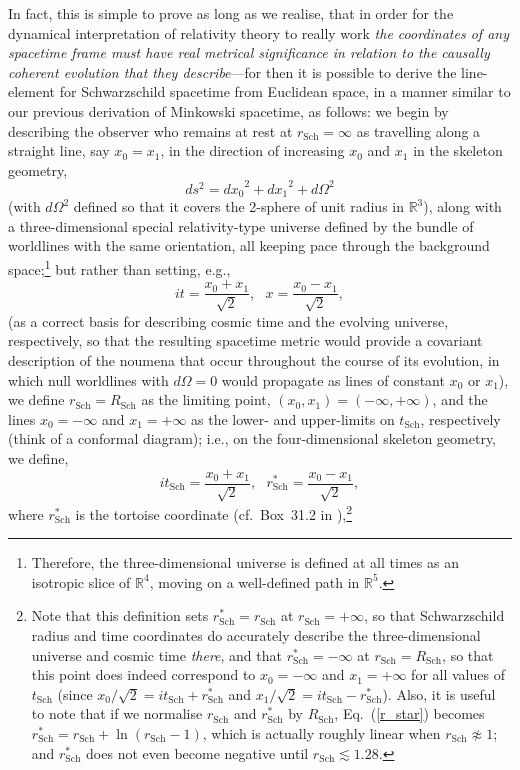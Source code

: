In fact, this is simple to prove as long as we realise, that in order for the dynamical interpretation of relativity theory to really work \textit{the coordinates of any spacetime frame must have real metrical significance in relation to the causally coherent evolution that they describe}---for then it is possible to derive the line-element for Schwarzschild spacetime from Euclidean space, in a manner similar to our previous derivation of Minkowski spacetime, as follows: we begin by describing the observer who remains at rest at $r_{\mathrm{Sch}}=\infty$ as travelling along a straight line, say $x_0=x_1$, in the direction of increasing $x_0$ and $x_1$ in the skeleton geometry,
\begin{equation}
ds^2={dx_0}^2+{dx_1}^2+d\Omega^2\label{R4}
\end{equation}
(with $d\Omega^2$ defined so that it covers the 2-sphere of unit radius in $\mathbb{R}^3$), along with a three-dimensional special relativity-type universe defined by the bundle of worldlines with the same orientation, all keeping pace through the background space;\footnote{Therefore, the three-dimensional universe is defined at all times as an isotropic slice of $\mathbb{R}^4$, moving on a well-defined path in $\mathbb{R}^5$.} but rather than setting, e.g.,
\begin{equation}
it=\frac{x_0+x_1}{\sqrt{2}},~~~x=\frac{x_0-x_1}{\sqrt{2}},\label{M4_coords}
\end{equation}
(as a correct basis for describing cosmic time and the evolving universe, respectively, so that the resulting spacetime metric would provide a covariant description of the noumena that occur throughout the course of its evolution, in which null worldlines with $d\Omega=0$ would propagate as lines of constant $x_0$ or $x_1$), we define $r_{\mathrm{Sch}}=R_{\mathrm{Sch}}$ as the limiting point, $(x_0,x_1)=(-\infty,+\infty)$, and the lines $x_0=-\infty$ and $x_1=+\infty$ as the lower- and upper-limits on $t_{\mathrm{Sch}}$, respectively (think of a conformal diagram); i.e., on the four-dimensional skeleton geometry, we define,
\begin{equation}
it_{\mathrm{Sch}}=\frac{x_0+x_1}{\sqrt{2}},~~~r^*_{\mathrm{Sch}}=\frac{x_0-x_1}{\sqrt{2}},\label{x0x1_R}
\end{equation}
where $r^*_{\mathrm{Sch}}$ is the tortoise coordinate (cf.~Box~31.2 in \cite{Misner1973}),\footnote{Note that this definition sets $r^*_{\mathrm{Sch}}=r_{\mathrm{Sch}}$ at $r_{\mathrm{Sch}}=+\infty$, so that Schwarzschild radius and time coordinates do accurately describe the three-dimensional universe and cosmic time \textit{there}, and that $r^*_{\mathrm{Sch}}=-\infty$ at $r_{\mathrm{Sch}}=R_{\mathrm{Sch}}$, so that this point does indeed correspond to $x_0=-\infty$ and $x_1=+\infty$ for all values of $t_{\mathrm{Sch}}$ (since $x_0/\sqrt{2}=it_{\mathrm{Sch}}+r^*_{\mathrm{Sch}}$ and $x_1/\sqrt{2}=it_{\mathrm{Sch}}-r^*_{\mathrm{Sch}}$). Also, it is useful to note that if we normalise $r_{\mathrm{Sch}}$ and $r_{\mathrm{Sch}}^*$ by $R_{\mathrm{Sch}}$, Eq.~(\ref{r_star}) becomes $r^*_{\mathrm{Sch}}=r_{\mathrm{Sch}}+\ln(r_{\mathrm{Sch}}-1)$, which is actually roughly linear when $r_{\mathrm{Sch}}\not\approx1$; and $r^*_{\mathrm{Sch}}$ does not even become negative until $r_{\mathrm{Sch}}\lesssim1.28$.}
